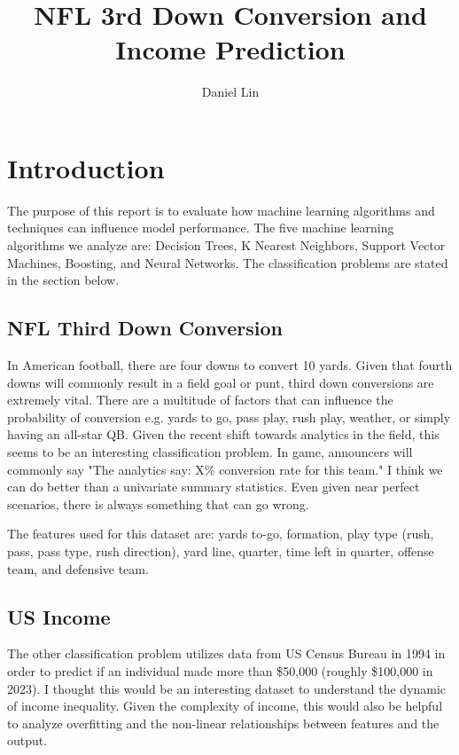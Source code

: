 \documentclass[12pt]{article}
\title{NFL 3rd Down Conversion and Income Prediction }
\author{Daniel Lin}
\begin{document}
\maketitle

\section{Introduction}

The purpose of this report is to evaluate how machine learning algorithms and techniques can influence model performance. The five machine learning algorithms we analyze are: Decision Trees, K Nearest Neighbors, Support Vector Machines, Boosting, and Neural Networks.  The classification problems are stated in the section below.

\subsection*{NFL Third Down Conversion}

In American football, there are four downs to convert 10 yards. Given that fourth downs will commonly result in a field goal or punt, third down conversions are extremely vital.  There are a multitude of factors that can influence the probability of conversion e.g. yards to go, pass play, rush play, weather, or simply having an all-star QB. Given the recent shift towards analytics in the field, this seems to be an interesting classification problem. In game, announcers will commonly say "The analytics say: X\% conversion rate for this team." I think we can do better than a univariate summary statistics. Even given near perfect scenarios, there is always something that can go wrong.

The features used for this dataset are:  yards to-go, formation, play type (rush, pass, pass type, rush direction), yard line, quarter, time left in quarter, offense team, and defensive team.

\subsection*{US Income}
The other classification problem utilizes data from US Census Bureau in 1994 in order to predict if an individual made more than \$50,000 (roughly \$100,000 in 2023). I thought this would be an interesting dataset to understand the dynamic of 
income inequality. Given the complexity of income, this would also be helpful to analyze overfitting and the non-linear relationships between features and the output. 
\end{document}
